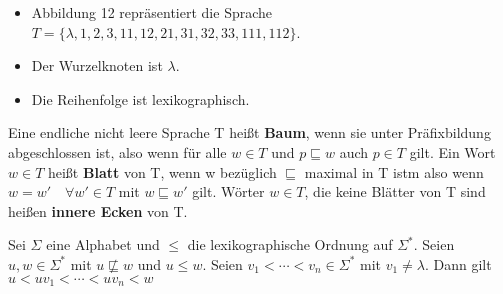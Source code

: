     \begin{center}
        
    \end{center}
    \createDiagram{}
    {
    }
    \begin{itemize}
        \item Abbildung 12 repräsentiert die Sprache $T = \{\lambda, 1, 2, 3, 11, 12, 21, 31, 32, 33, 111, 112\}$.
        \item Der Wurzelknoten ist $\lambda$.
        \item Die Reihenfolge ist lexikographisch.
    \end{itemize}
    
    Eine endliche nicht leere Sprache T heißt \textbf{Baum}, wenn sie unter Präfixbildung abgeschlossen ist, also wenn für alle \(w \in T\) und \(p \sqsubseteq w\) auch \(p \in T\) gilt. Ein Wort \(w \in T\) heißt \textbf{Blatt} von T, wenn w bezüglich \(\sqsubseteq \) maximal in T istm also wenn \(w = w' \quad \forall w' \in T\) mit \(w \sqsubseteq w'\) gilt. Wörter \(w \in T\), die keine Blätter von T sind heißen \textbf{innere Ecken} von T.

    Sei \(\Sigma\) eine Alphabet und \(\leq\) die lexikographische Ordnung auf \(\Sigma^*\). Seien \(u, w \in \Sigma^*\) mit \(u \not \sqsubseteq w\) und \(u \leq w\). Seien \(v_1<\cdots<v_n \in \Sigma^*\) mit \(v_1 \not = \lambda\). Dann gilt \(u < u v_1< \cdots < uv_n < w\)

